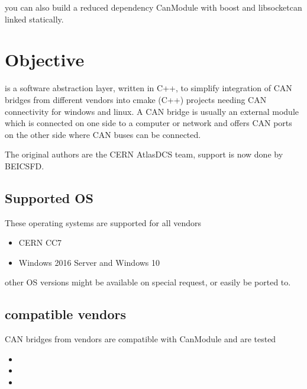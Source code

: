 \documentclass[a4paper,10pt,english]{sphinxmanual}
\begin{document}
\sphinxAtStartPar
you can also build a reduced dependency CanModule with boost and libsocketcan linked statically.


\chapter{Objective}
\label{\detokenize{objective:objective}}\label{\detokenize{objective::doc}}
\sphinxAtStartPar
{} is a software abstraction layer, written in C++, to simplify integration
of CAN bridges from different vendors into cmake (C++) projects needing CAN connectivity
for windows and linux. A CAN bridge is \sphinxhyphen{} usually \sphinxhyphen{} an external module which is connected
on one side to a computer or network and offers CAN ports on the other side where CAN buses
can be connected.

\sphinxAtStartPar
The original authors are the CERN Atlas\sphinxhyphen{}DCS team, support is now done by BE\sphinxhyphen{}ICS\sphinxhyphen{}FD.


\section{Supported OS}
\label{\detokenize{objective:supported-os}}
\sphinxAtStartPar
These operating systems are supported for all vendors
\begin{itemize}
\item {} 
\sphinxAtStartPar
CERN CC7

\item {} 
\sphinxAtStartPar
Windows 2016 Server and Windows 10

\end{itemize}

\sphinxAtStartPar
other OS versions might be available on special request, or easily be ported to.


\section{compatible vendors}
\label{\detokenize{objective:compatible-vendors}}
\sphinxAtStartPar
CAN bridges from vendors are compatible with CanModule and are tested
\begin{itemize}
\item {} 
\sphinxAtStartPar
{}

\item {} 
\sphinxAtStartPar
{}

\item {} 
\sphinxAtStartPar
{}

\end{itemize}
\end{document}
